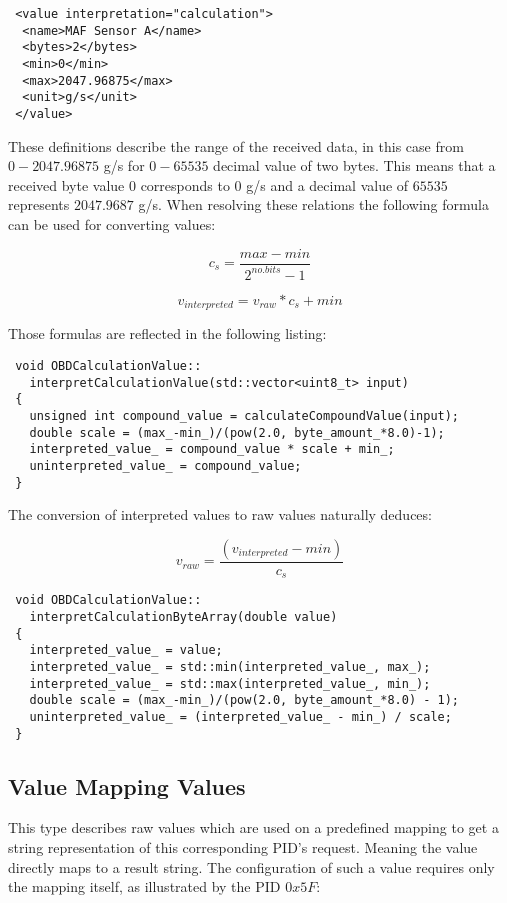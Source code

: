 \begin{verbatim}
 <value interpretation="calculation">
  <name>MAF Sensor A</name>
  <bytes>2</bytes>
  <min>0</min>
  <max>2047.96875</max>
  <unit>g/s</unit>
 </value>
\end{verbatim}

These definitions describe the range of the received data, in this case from $0-2047.96875$ g/s for $0-65535$ decimal value of two bytes. 
This means that a received byte value $0$ corresponds to $0$ g/s and a decimal value of $65535$ represents $2047.9687$ g/s. When resolving these 
relations the following formula can be used for converting values: 

\[ c_s = \frac{max - min}{2^{no. bits} - 1} \]

\[ v_{interpreted} = v_{raw} * c_s + min \]

Those formulas are reflected in the following listing:

\begin{verbatim}
 void OBDCalculationValue::
   interpretCalculationValue(std::vector<uint8_t> input)
 {
   unsigned int compound_value = calculateCompoundValue(input);
   double scale = (max_-min_)/(pow(2.0, byte_amount_*8.0)-1);
   interpreted_value_ = compound_value * scale + min_;
   uninterpreted_value_ = compound_value;
 }
\end{verbatim}

The conversion of interpreted values to raw values naturally deduces:

\[ v_{raw} = \frac{(v_{interpreted} - min)}{c_s} \]

\begin{verbatim}
 void OBDCalculationValue::
   interpretCalculationByteArray(double value)
 {
   interpreted_value_ = value;
   interpreted_value_ = std::min(interpreted_value_, max_);
   interpreted_value_ = std::max(interpreted_value_, min_);
   double scale = (max_-min_)/(pow(2.0, byte_amount_*8.0) - 1);
   uninterpreted_value_ = (interpreted_value_ - min_) / scale;
 }
\end{verbatim}

\subsection{Value Mapping Values}

This type describes raw values which are used on a predefined mapping to get a string representation of this corresponding PID's request. Meaning the 
value directly maps to a result string. The configuration of such a value requires only the mapping itself, as illustrated by the PID $0x5F$:

